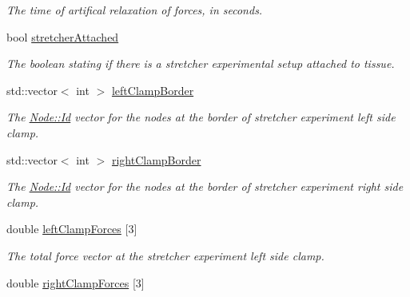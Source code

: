 \begin{DoxyCompactItemize}
\begin{DoxyCompactList}\small\item\em The time of artifical relaxation of forces, in seconds. \end{DoxyCompactList}\item 
\hypertarget{classSimulation_ab998930bbef90a5a59ba86079a44e7ae}{}bool \hyperlink{classSimulation_ab998930bbef90a5a59ba86079a44e7ae}{stretcher\+Attached}\label{classSimulation_ab998930bbef90a5a59ba86079a44e7ae}

\begin{DoxyCompactList}\small\item\em The boolean stating if there is a stretcher experimental setup attached to tissue. \end{DoxyCompactList}\item 
\hypertarget{classSimulation_a822045adc54ecbf2a5c33c65eeb856e8}{}std\+::vector$<$ int $>$ \hyperlink{classSimulation_a822045adc54ecbf2a5c33c65eeb856e8}{left\+Clamp\+Border}\label{classSimulation_a822045adc54ecbf2a5c33c65eeb856e8}

\begin{DoxyCompactList}\small\item\em The \hyperlink{classNode_a1bd379569cc1a8b96432e61971aed4d9}{Node\+::\+Id} vector for the nodes at the border of stretcher experiment left side clamp. \end{DoxyCompactList}\item 
\hypertarget{classSimulation_a73e68a828b5ec906e9b949aebd087098}{}std\+::vector$<$ int $>$ \hyperlink{classSimulation_a73e68a828b5ec906e9b949aebd087098}{right\+Clamp\+Border}\label{classSimulation_a73e68a828b5ec906e9b949aebd087098}

\begin{DoxyCompactList}\small\item\em The \hyperlink{classNode_a1bd379569cc1a8b96432e61971aed4d9}{Node\+::\+Id} vector for the nodes at the border of stretcher experiment right side clamp. \end{DoxyCompactList}\item 
\hypertarget{classSimulation_ad6d5bb340613f0a93a71bb8f3a73f609}{}double \hyperlink{classSimulation_ad6d5bb340613f0a93a71bb8f3a73f609}{left\+Clamp\+Forces} \mbox{[}3\mbox{]}\label{classSimulation_ad6d5bb340613f0a93a71bb8f3a73f609}

\begin{DoxyCompactList}\small\item\em The total force vector at the stretcher experiment left side clamp. \end{DoxyCompactList}\item 
\hypertarget{classSimulation_aa88acfad799773f87059228a07d40b37}{}double \hyperlink{classSimulation_aa88acfad799773f87059228a07d40b37}{right\+Clamp\+Forces} \mbox{[}3\mbox{]}\label{classSimulation_aa88acfad799773f87059228a07d40b37}


\end{DoxyCompactItemize}
